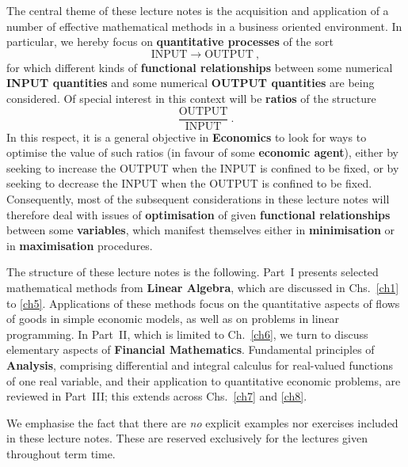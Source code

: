 \medskip
\noindent
The central theme of these lecture notes is the acquisition and 
application of a number of effective mathematical methods in a 
business oriented environment. In particular, we hereby focus on 
{\bf quantitative processes} of the sort
%
\[
\text{INPUT} \rightarrow \text{OUTPUT} \ ,
\]
%
for which different kinds of {\bf functional relationships} 
between some numerical {\bf INPUT quantities} and some numerical 
{\bf OUTPUT quantities} are being considered. Of special interest 
in this context will be {\bf ratios} of the structure
%
\[
\frac{\text{OUTPUT}}{\text{INPUT}} \ .
\]
%
In this respect, it is a general objective in {\bf Economics} to 
look for ways to optimise the value of such ratios (in favour of 
some {\bf economic agent}), either by seeking to increase the 
OUTPUT when the INPUT is confined to be fixed, or by seeking to 
decrease the INPUT when the OUTPUT is confined to be fixed. 
Consequently, most of the subsequent considerations in these 
lecture notes will therefore deal with issues of {\bf 
optimisation} of given {\bf functional relationships} between some 
{\bf variables}, which manifest themselves either in {\bf 
minimisation} or in {\bf maximisation} procedures.

\medskip
\noindent
The structure of these lecture notes is the following. Part~I 
presents selected mathematical methods from {\bf Linear Algebra}, 
which are discussed in Chs.~\ref{ch1} to \ref{ch5}. Applications 
of these methods focus on the quantitative aspects of flows 
of goods in simple economic models, as well as on problems in 
linear programming. In Part~II, which is limited to 
Ch.~\ref{ch6}, we turn to discuss elementary aspects of {\bf 
Financial Mathematics}. Fundamental principles of {\bf Analysis}, 
comprising differential and integral calculus for real-valued 
functions of one real variable, and their application to 
quantitative economic problems, are reviewed in Part~III; this
extends across Chs.~\ref{ch7} and \ref{ch8}.

\medskip
\noindent
We emphasise the fact that there are \emph{no} explicit examples 
nor exercises included in these lecture notes. These are reserved 
exclusively for the lectures given throughout term time.

